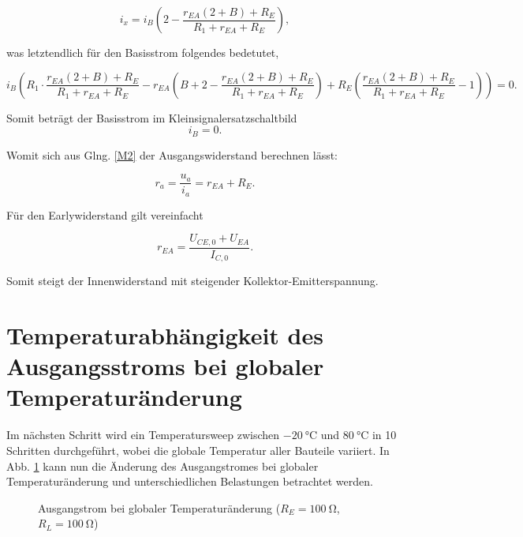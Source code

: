 \begin{equation}
     i_x = i_B\left(2 - \frac{r_{EA}(2 + B) + R_E}{R_1 + r_{EA} + R_E} \right) ,
\end{equation}

was letztendlich für den Basisstrom folgendes bedetutet,

\begin{equation}
    i_{B} \left(R_1 \cdot \frac{r_{EA}(2 + B) + R_E}{R_1 + r_{EA} + R_E} - r_{EA}\left(B + 2 - \frac{r_{EA}(2 + B) + R_E}{R_1 + r_{EA} + R_E}\right) + R_E \left(\frac{r_{EA}(2 + B) + R_E}{R_1 + r_{EA} + R_E} - 1\right) \right) = 0 .
\end{equation}

Somit beträgt der Basisstrom im Kleinsignalersatzschaltbild 
\begin{equation}
    i_B = 0 .
\end{equation}

Womit sich aus Glng. \ref{M2} der Ausgangswiderstand berechnen lässt:

\begin{equation}
    r_a = \frac{u_a}{i_a} = r_{EA} + R_E .
\end{equation}

Für den Earlywiderstand gilt vereinfacht

\begin{equation}
    r_{EA} = \frac{U_{CE,0} + U_{EA}}{I_{C,0}} .
\end{equation}

Somit steigt der Innenwiderstand mit steigender Kollektor-Emitterspannung.

\section{Temperaturabhängigkeit des Ausgangsstroms bei globaler Temperaturänderung}
Im nächsten Schritt wird ein Temperatursweep zwischen $\SI{-20}{\celsius}$ und $\SI{80}{\celsius}$ in 10 Schritten durchgeführt, wobei die globale Temperatur aller Bauteile variiert. In Abb. \ref{fig_Kap4_06:T_1} kann nun die Änderung des Ausgangstromes bei globaler Temperaturänderung und unterschiedlichen Belastungen betrachtet werden. 

\begin{figure}[H]
	\centering \small
	\scalebox{0.9}{}
	\caption{Ausgangstrom bei globaler Temperaturänderung ($R_E = \SI{100}{\ohm}$, $R_L = \SI{100}{\ohm}$)}
	\label{fig_Kap4_06:T_1}
\end{figure}


